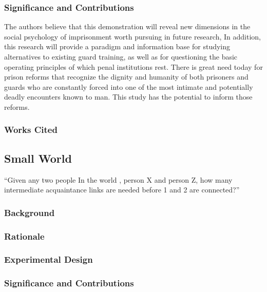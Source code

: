 \begin{refsection}
\subsubsection{Significance and Contributions}
\label{significanceandcontributions}

The authors believe that this demonstration will reveal new dimensions in the social psychology of imprisonment worth pursuing in future research, In addition, this research will provide a paradigm and information base for studying alternatives to existing guard training, as well as for questioning the basic operating principles of which penal institutions rest. There is great need today for prison reforms that recognize the dignity and humanity of both prisoners and guards who are constantly forced into one of the most intimate and potentially deadly encounters known to man. This study has the potential to inform those reforms.

\subsubsection{Works Cited}
\label{workscited}

\newpage

\subsection{Small World}
\label{smallworld}

“Given any two people In the world , person X and person Z, how many intermediate acquaintance links are needed before 1 and 2 are connected?”

\subsubsection{Background}
\label{background}

\subsubsection{Rationale}
\label{rationale}

\subsubsection{Experimental Design}
\label{experimentaldesign}

\subsubsection{Significance and Contributions}
\label{significanceandcontributions}


\end{refsection}
